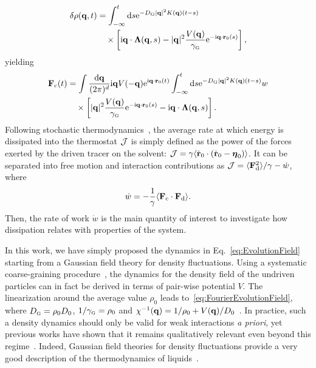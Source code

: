 \documentclass[pre, superscriptaddress, twocolumn,pre]{revtex4-1}
\newcommand{\dd}{\text{d}}
\newcommand{\ee}{\text{e}}
\newcommand{\ii}{\text{i}}
\begin{document}
\begin{equation}
	\begin{aligned}
		\delta\rho({\bf q},t) &= \int_{-\infty}^t \dd s \ee^{-D_\text{\tiny G} |{\bf q}|^2 K({\bf q})(t-s)}
		\\
		&\quad\times \left[ \ii{\bf q} \cdot {\boldsymbol\Lambda}({\bf q},s) - |{\bf q}|^2 \frac{V({\bf q})}{\gamma_\text{\tiny G}} \ee^{-\ii {\bf q}\cdot {\bf r}_0(s)}\right] ,
	\end{aligned}
\end{equation}
yielding
\begin{equation}\label{eq:ConservativeForce}
	\begin{aligned}
		{\bf F}_\text{c}(t) &= \int \frac{\dd{\bf q}}{(2\pi)^d} \ii{\bf q} V(-{\bf q}) \ee^{\ii{\bf q} \cdot {\bf r}_0(t)} \int_{-\infty}^t \dd s \ee^{-D_\text{\tiny G} |{\bf q}|^2 K({\bf q})(t-s)}
w		\\
		&\quad\times \left[ |{\bf q}|^2 \frac{ V({\bf q})}{\gamma_\text{\tiny G}} \ee^{-\ii{\bf q} \cdot {\bf r}_0(s)} - \ii{\bf q} \cdot {\bf\Lambda}({\bf q}, s) \right] .
	\end{aligned}
\end{equation}
Following stochastic thermodynamics~\cite{Sekimoto1998, Seifert2012}, the average rate at which energy is dissipated into the thermostat $\cal J$ is simply defined as the power of the forces exerted by the driven tracer on the solvent: ${\cal J} = \gamma \langle\dot{\bf r}_0\cdot(\dot{\bf r}_0-{\boldsymbol\eta}_0)\rangle$. It can be separated into free motion and interaction contributions as ${\cal J} = \langle{\bf F}_\text{d}^2\rangle/\gamma - \dot w$, where
\begin{equation}\label{eq:work}
	\dot{w} = -\frac{1}{\gamma} \langle{\bf F}_\text{c}\cdot {\bf F}_\text{d}\rangle .
\end{equation}
Then, the rate of work $\dot w$ is the main quantity of interest to investigate how dissipation relates with properties of the system.

In this work, we have simply proposed the dynamics in Eq.~\ref{eq:EvolutionField} starting from a Gaussian field theory for density fluctuations. 
Using a systematic coarse-graining procedure~\cite{Dean1996}, the dynamics for the density field of the undriven particles can in fact be derived in terms of pair-wise potential $V$. The linearization around the average value $\rho_0$ leads to~\eqref{eq:FourierEvolutionField}, where $D_\text{\tiny G}=\rho_0D_0$, $1/\gamma_\text{\tiny G}=\rho_0$ and $\chi^{-1}({\bf q}) = 1/\rho_0 + V({\bf q})/D_0$~\cite{Demery2011, Demery2014}. In practice, such a density dynamics should only be valid for weak interactions {\it a priori}, yet previous works have shown that it remains qualitatively relevant even beyond this regime~\cite{Demery2015, Martin2018}. Indeed, Gaussian field theories for density fluctuations provide a very good description of the thermodynamics of liquids~\cite{Chandler1993}.
\end{document}
